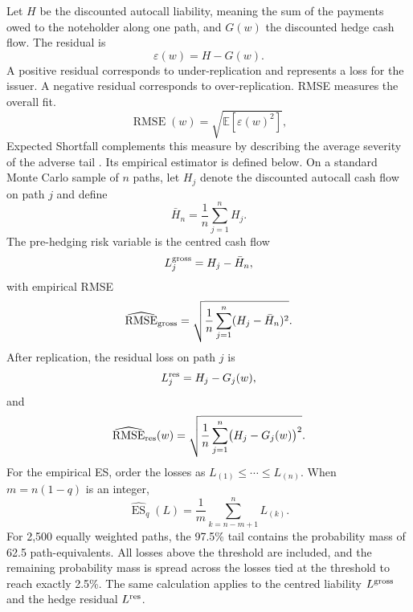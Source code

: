\documentclass[12pt,a4paper]{article}
\newcommand{\E}{\mathbb{E}}
\newcommand{\ES}{\operatorname{ES}}
\newcommand{\RMSE}{\operatorname{RMSE}}
\newcommand{\1}{\mathbf{1}}
\begin{document}
Let $H$ be the discounted autocall liability, meaning the sum of the payments owed to the noteholder along one path, and $G(w)$ the discounted hedge cash flow. The residual is
\begin{equation}
 \varepsilon(w)=H-G(w).
\label{eq:residual}
\end{equation}
A positive residual corresponds to under-replication and represents a loss for the issuer. A negative residual corresponds to over-replication. RMSE measures the overall fit.
\begin{equation}
 \RMSE(w)=\sqrt{\E[\varepsilon(w)^2]},
\label{eq:rmse}
\end{equation}
Expected Shortfall complements this measure by describing the average severity
of the adverse tail \cite{mcneil2015,rockafellar2000}. Its empirical estimator is
defined below.
On a standard Monte Carlo sample of $n$ paths, let $H_j$ denote the discounted autocall cash flow on path $j$ and define
\begin{equation}
 \bar H_n=\frac{1}{n}\sum_{j=1}^{n}H_j.
\label{eq:empirical-liability-mean}
\end{equation}
The pre-hedging risk variable is the centred cash flow
\begin{equation}
 L_j^{\rm gross}=H_j-\bar H_n,
\label{eq:empirical-gross-loss}
\end{equation}
with empirical RMSE
\begin{equation}
 \widehat{\RMSE}_{\rm gross}
 =\sqrt{\frac{1}{n}\sum_{j=1}^{n}(H_j-\bar H_n)^2}.
\label{eq:empirical-gross-rmse}
\end{equation}
After replication, the residual loss on path $j$ is
\begin{equation}
 L_j^{\rm res}=H_j-G_j(w),
\label{eq:empirical-residual-loss}
\end{equation}
and
\begin{equation}
 \widehat{\RMSE}_{\rm res}(w)
 =\sqrt{\frac{1}{n}\sum_{j=1}^{n}\bigl(H_j-G_j(w)\bigr)^2}.
\label{eq:empirical-residual-rmse}
\end{equation}
For the empirical ES, order the losses as $L_{(1)}\leq\cdots\leq L_{(n)}$. When $m=n(1-q)$ is an integer,
\begin{equation}
 \widehat{\ES}_{q}(L)
 =\frac{1}{m}\sum_{k=n-m+1}^{n}L_{(k)}.
\label{eq:empirical-es}
\end{equation}
For 2,500 equally weighted paths, the 97.5\% tail contains the probability mass of 62.5 path-equivalents. All losses above the threshold are included, and the remaining probability mass is spread across the losses tied at the threshold to reach exactly 2.5\%. The same calculation applies to the centred liability $L^{\rm gross}$ and the hedge residual $L^{\rm res}$.
\end{document}
